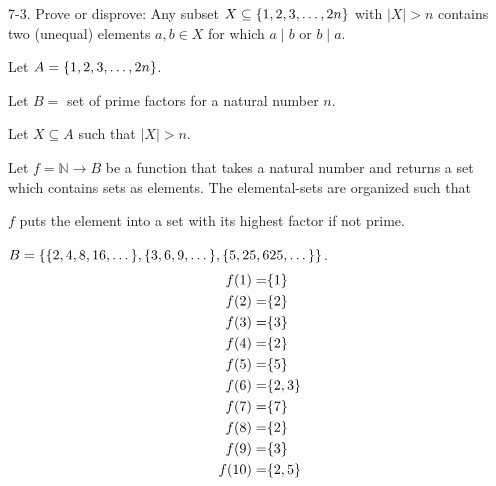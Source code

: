 \documentclass{article}
\begin{document}
\begin{exercise}{}{}
	{7-3. Prove or disprove: Any subset $X \subseteq\{1,2,3, \ldots,
				2 n\}$ with $|X|>n$ contains two (unequal) elements $a, b \in X$ for which
		$a \mid b$ or $b \mid a$.}
	\begin{alist}
		\item Let $A=\{1,2,3, \ldots, 2 n\}$.
		\item Let $B=$ set of prime factors for a natural number $n$.
		\item Let $X\subseteq A$ such that $|X|>n$.
		\item Let $f=\mathbb{N} \rightarrow B $ be a function that takes a natural
		number and returns a set which contains sets as elements. The elemental-sets
		are organized such that
		\item $f$ puts the element into a set with its highest factor if not prime.
		\item $B=\{\{2, 4, 8, 16,\dots\}, \{3, 6, 9, \dots\}, \{5, 25, 625,
					\dots\}\}$.
		\begin{align*}
			f(1) =  & \{1\}    \\
			f(2) =  & \{2\}    \\
			f(3) =  & \{3\}    \\
			f(4) =  & \{2\}    \\
			f(5) =  & \{5\}    \\
			f(6) =  & \{2, 3\} \\
			f(7) =  & \{7\}    \\
			f(8) =  & \{2\}    \\
			f(9) =  & \{3\}    \\
			f(10) = & \{2, 5\}
		\end{align*}
	\end{alist}
\end{exercise}{}{}
\end{document}
